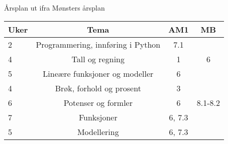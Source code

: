 \documentclass{article}
\begin{document}
\newpage
Årsplan ut ifra Mønsters årsplan 
\begin{center}
	\begin{tabular}{|l | c | c | c|}
		\textbf{Uker} & \textbf{Tema} & \textbf{AM1} & \textbf{MB} \\ \hline 
		2 & Programmering, innføring i Python & 7.1	 & \\ \hline 
		4 & Tall og regning & 1 & 6 \\ \hline
		5 & Lineære funksjoner og modeller & 6 & \\ \hline
		4 & Brøk, forhold og prosent & 3 & \\ \hline
		6 & Potenser og formler & 6 & 8.1-8.2 \\ \hline
		7 & Funksjoner & 6, 7.3 & \\ \hline
		5 & Modellering & 6, 7.3 &
	\end{tabular}
\end{center}
\end{document}
